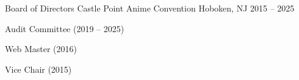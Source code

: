 

\begin{cvhonors}


	\cventry
		{Board of Directors} %
		{Castle Point Anime Convention} %
		{Hoboken, NJ} %
		{2015 – 2025} %
		{
			\begin{cvitems}
				\item {Audit Committee (2019 – 2025)}
				\item {Web Master (2016)}
				\item {Vice Chair (2015)}
			\end{cvitems}
		}

\end{cvhonors}

